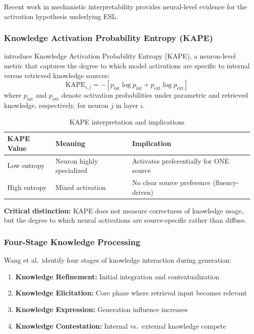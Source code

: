 \documentclass[11pt,a4paper]{article}
\begin{document}
Recent work in mechanistic interpretability provides neural-level evidence for the activation hypothesis underlying ESL.

\subsubsection{Knowledge Activation Probability Entropy (KAPE)}

\citet{wang2025kape} introduce Knowledge Activation Probability Entropy (KAPE), a neuron-level metric that captures the degree to which model activations are specific to internal versus retrieved knowledge sources:
\begin{equation}
\text{KAPE}_{i,j} = - \left[ p_{\text{int}} \log p_{\text{int}} + p_{\text{ext}} \log p_{\text{ext}} \right]
\end{equation}
where $p_{\text{int}}$ and $p_{\text{ext}}$ denote activation probabilities under parametric and retrieved knowledge, respectively, for neuron $j$ in layer $i$.

\begin{table}[H]
\centering
\caption{KAPE interpretation and implications}
\begin{tabular}{lll}
\toprule
\textbf{KAPE Value} & \textbf{Meaning} & \textbf{Implication} \\
\midrule
Low entropy & Neuron highly specialized & Activates preferentially for ONE source \\
High entropy & Mixed activation & No clear source preference (fluency-driven) \\
\bottomrule
\end{tabular}
\end{table}

\textbf{Critical distinction:} KAPE does not measure correctness of knowledge usage, but the degree to which neural activations are source-specific rather than diffuse.

\subsubsection{Four-Stage Knowledge Processing}

Wang et al.\ identify four stages of knowledge interaction during generation:
\begin{enumerate}
    \item \textbf{Knowledge Refinement:} Initial integration and contextualization
    \item \textbf{Knowledge Elicitation:} Core phase where retrieval input becomes relevant
    \item \textbf{Knowledge Expression:} Generation influence increases
    \item \textbf{Knowledge Contestation:} Internal vs.\ external knowledge compete
\end{enumerate}
\end{document}
